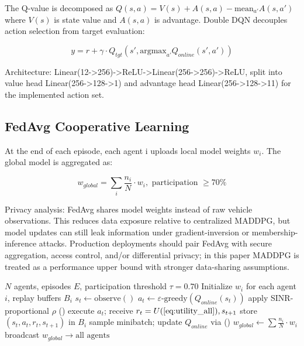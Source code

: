 The Q-value is decomposed as $Q(s,a) = V(s) + A(s,a) - \text{mean}_{a'} A(s,a')$ where $V(s)$ is state value and $A(s,a)$ is advantage. Double DQN decouples action selection from target evaluation:

\begin{equation}
\label{eq:ddqn}
y = r + \gamma \cdot Q_{tgt}(s', \text{argmax}_{a'} Q_{online}(s', a'))
\end{equation}

Architecture: Linear(12->256)->ReLU->Linear(256->256)->ReLU, split into value head Linear(256->128->1) and advantage head Linear(256->128->11) for the implemented action set.

\subsection{FedAvg Cooperative Learning}

At the end of each episode, each agent i uploads local model weights $w_i$. The global model is aggregated as:

\begin{equation}
\label{eq:fedavg}
w_{global} = \sum_i \frac{n_i}{N} \cdot w_i, \text{ participation } \geq 70\%
\end{equation}

Privacy analysis: FedAvg shares model weights instead of raw vehicle observations. This reduces data exposure relative to centralized MADDPG, but model updates can still leak information under gradient-inversion or membership-inference attacks. Production deployments should pair FedAvg with secure aggregation, access control, and/or differential privacy; in this paper MADDPG is treated as a performance upper bound with stronger data-sharing assumptions.

\begin{algorithm}[htbp]
\caption{MA-ROPE Training with FedAvg}
\label{alg:ma_rope}
\begin{algorithmic}[1]
\REQUIRE $N$ agents, episodes $E$, participation threshold $\tau=0.70$
\STATE Initialize $w_i$ for each agent $i$, replay buffers $B_i$
        \STATE $s_t \leftarrow \text{observe}()$ 
        \STATE $a_t \leftarrow \varepsilon\text{-greedy}(Q_{online}(s_t))$
        \STATE apply SINR-proportional $\rho$ ()
        \STATE execute $a_t$; receive $r_t = U (\text{\Cref{eq:utility_all}}), s_{t+1}$
        \STATE store $(s_t, a_t, r_t, s_{t+1})$ in $B_i$
        \STATE sample minibatch; update $Q_{online}$ via ()
    \ENDFOR
        \STATE $w_{global} \leftarrow \sum \frac{n_i}{N} \cdot w_i$ 
        \STATE broadcast $w_{global} \rightarrow \text{all agents}$
    \ENDIF
\ENDFOR
\end{algorithmic}
\end{algorithm}
